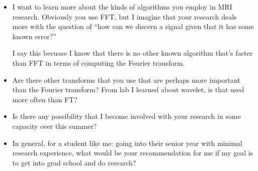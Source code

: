 \documentclass[10pt]{article}
\begin{document}
\begin{itemize}
	\item I want to learn more about the kinds of algorithms you employ in MRI research. Obviously you use FFT, but 
		I imagine that your research deals more with the question of ``how can we discern a signal given 
		that it has some known error?''

		I say this becuase I know that there is no other known algorithm that's faster than FFT in terms of 
		computing the Fourier transform. 
	\item Are there other transforms that you use that are perhaps more important than the Fourier transform? 
		From lab I learned about wavelet, is that used more often than FT?
	\item Is there any possibility that I become involved with your research in some capacity over this summer? 
	\item In general, for a student like me: going into their senior year with minimal research experience, 
		what would be your recommendation for me if my goal is to get into grad school and do research?  
\end{itemize}
\end{document}
